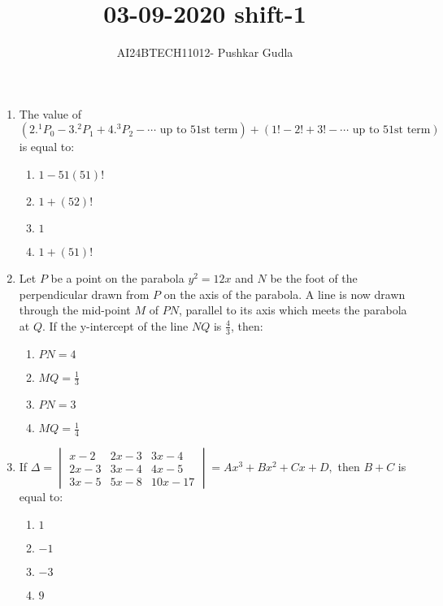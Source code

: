 \documentclass[journal,12pt,onecolumn]{IEEEtran}
\theoremstyle{remark}
\begin{document}

\vspace{3cm}

\title{\textbf{03-09-2020 shift-1}}
\author{AI24BTECH11012- Pushkar Gudla}
\maketitle
\bigskip

\renewcommand{\thefigure}{\theenumi}
\renewcommand{\thetable}{\theenumi}
\setlength{\columnsep}{2.5em}


\begin{enumerate}
    \item The value of $ (2.^1P_0 - 3.^2P_1 + 4.^3P_2 - \cdots \text{ up to 51st term}) + (1! - 2! + 3! - \cdots \text{ up to 51st term}) $ 
    is equal to:
    \begin{enumerate}
        \item $ 1 - 51(51)! $
        \item $ 1 + (52)! $
        \item $ 1 $
        \item $ 1 + (51)! $
    \end{enumerate}

    \item Let $P$ be a point on the parabola $ y^2 = 12x $ and $ N $ be the foot of the perpendicular drawn from $ P $ on the axis of the parabola. A line is now drawn through the mid-point $ M $ of $ PN $, parallel to its axis which meets the parabola at $ Q $. If the y-intercept of the line $ NQ $ is $ \frac{4}{3} $, then:
    \begin{enumerate}
        \item $ PN = 4 $
        \item $ MQ = \frac{1}{3} $
        \item $ PN = 3 $
        \item $ MQ = \frac{1}{4} $
    \end{enumerate}

    \item If $ \Delta = \begin{vmatrix}
    x-2 & 2x-3 & 3x-4 \\
    2x-3 & 3x-4 & 4x-5 \\
    3x-5 & 5x-8 & 10x-17
    \end{vmatrix} = Ax^3 + Bx^2 + Cx + D, $ 
    then $ B + C $ is equal to:
    \begin{enumerate}
        \item $ 1 $
        \item $ -1 $
        \item $ -3 $
        \item $ 9 $
    \end{enumerate}


\end{enumerate}
\end{document}
